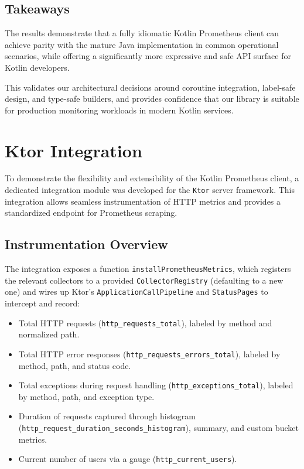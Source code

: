 \subsection*{Takeaways}

The results demonstrate that a fully idiomatic Kotlin Prometheus client can achieve parity with the mature Java implementation in common operational scenarios, while offering a significantly more expressive and safe API surface for Kotlin developers.

This validates our architectural decisions around coroutine integration, label-safe design, and type-safe builders, and provides confidence that our library is suitable for production monitoring workloads in modern Kotlin services.



\section{Ktor Integration}

To demonstrate the flexibility and extensibility of the Kotlin Prometheus client, a dedicated integration module was developed for the \texttt{Ktor} server framework. This integration allows seamless instrumentation of HTTP metrics and provides a standardized endpoint for Prometheus scraping.

\subsection*{Instrumentation Overview}
The integration exposes a function \texttt{installPrometheusMetrics}, which registers the relevant collectors to a provided \texttt{CollectorRegistry} (defaulting to a new one) and wires up Ktor's \texttt{ApplicationCallPipeline} and \texttt{StatusPages} to intercept and record:

\begin{itemize}
  \item Total HTTP requests (\texttt{http\_requests\_total}), labeled by method and normalized path.
  \item Total HTTP error responses (\texttt{http\_requests\_errors\_total}), labeled by method, path, and status code.
  \item Total exceptions during request handling (\texttt{http\_exceptions\_total}), labeled by method, path, and exception type.
  \item Duration of requests captured through histogram (\texttt{http\_request\_duration\_seconds\_histogram}), summary, and custom bucket metrics.
  \item Current number of users via a gauge (\texttt{http\_current\_users}).
\end{itemize}

